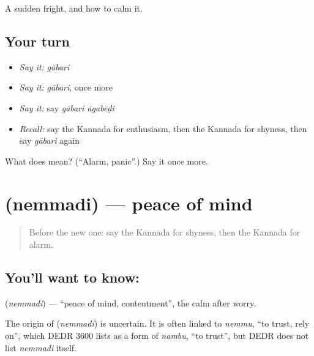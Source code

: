 \begin{grammarlens}[title={What you've built}]
A sudden fright, and how to calm it.
\end{grammarlens}

\subsection*{Your turn}
\begin{itemize}
\raggedright
  \item \emph{Say it:} \emph{gābari}
  \item \emph{Say it:} \emph{gābari}, once more
  \item \emph{Say it:} say \emph{gābari āgabēḍi}
  \item \emph{Recall:} say the Kannada for enthusiasm, then the Kannada for shyness, then say \emph{gābari} again
\end{itemize}

\begin{tcolorbox}[breakable,colback=teal!4,colframe=teal!35!black,title={Before you move on}]
What does  mean? (\textquotedblleft{}Alarm, panic\textquotedblright{}.) Say it once more.
\end{tcolorbox}
\section[\texorpdfstring{\kn{ನೆಮ್ಮದಿ} (nemmadi)}{ನೆಮ್ಮದಿ (nemmadi)}]{ (nemmadi) — peace of mind}

\label{lesson:KA-C98-peace}



\begin{quote}
Before the new one: say the Kannada for shyness, then the Kannada for alarm.
\end{quote}

\subsection*{You'll want to know: }
\textbf{} (\emph{nemmadi}) — \textquotedblleft{}peace of mind, contentment\textquotedblright{}, the calm after worry.

\begin{cousinweb}
The origin of \textbf{} (\emph{nemmadi}) is uncertain. It is often linked to \emph{nemmu}, \textquotedblleft{}to trust, rely on\textquotedblright{}, which DEDR 3600 lists as a form of \emph{nambu}, \textquotedblleft{}to trust\textquotedblright{}, but DEDR does not list \emph{nemmadi} itself.
\end{cousinweb}

